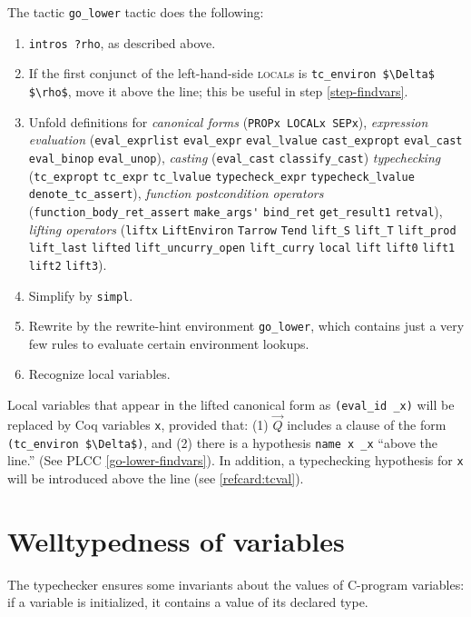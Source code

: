 \documentclass[12pt,fleqn,openany,oneside,showtrims]{memoir}
\newcommand{\ychapter}[2]{\chapter[#1]{#1 \hfill \normalsize #2}}
\begin{document}
The tactic \lstinline{go_lower} tactic
does the following:
\begin{enumerate}
\item \lstinline{intros ?rho}, as described above.
\item If the first conjunct of the 
left-hand-side \textsc{local}s is
\lstinline{tc_environ $\Delta$ $\rho$}, move it
above the line; this be useful in step \ref{step-findvars}.
\item Unfold definitions for
\emph{canonical forms}
(\lstinline{PROPx LOCALx SEPx}),
\emph{expression evaluation}
(\lstinline{eval_exprlist}
\lstinline{eval_expr}
\lstinline{eval_lvalue}
\lstinline{cast_expropt}
\lstinline{eval_cast}
\lstinline{eval_binop}
\lstinline{eval_unop}),
\emph{casting} (\lstinline{eval_cast} \lstinline{classify_cast})
\emph{typechecking} (\lstinline{tc_expropt}
\lstinline{tc_expr}
\lstinline{tc_lvalue}
\lstinline{typecheck_expr}
\lstinline{typecheck_lvalue}
\lstinline{denote_tc_assert}),
\emph{function postcondition operators} (\lstinline{function_body_ret_assert}
\lstinline{make_args'}
\lstinline{bind_ret}
\lstinline{get_result1}
\lstinline{retval}),
\emph{lifting operators} (\lstinline{liftx}
\lstinline{LiftEnviron}
\lstinline{Tarrow}
\lstinline{Tend}
\lstinline{lift_S}
\lstinline{lift_T}
\lstinline{lift_prod}
\lstinline{lift_last}
\lstinline{lifted}
\lstinline{lift_uncurry_open}
\lstinline{lift_curry}
\lstinline{local}
\lstinline{lift}
\lstinline{lift0}
\lstinline{lift1}
\lstinline{lift2}
\lstinline{lift3}).
\item Simplify by \lstinline{simpl}.
\item Rewrite by the rewrite-hint environment \lstinline{go_lower}, which contains just a very few rules to evaluate certain environment lookups.
\item Recognize local variables. \label{step-findvars}
\end{enumerate}

Local variables that appear in the lifted canonical form
as \lstinline{(eval_id _x)} will be replaced by
Coq variables \lstinline{x}, provided that:
(1)  $\vec{Q}$ includes a clause of the
form \lstinline{(tc_environ $\Delta$)},
and (2) there is a hypothesis \lstinline{name x _x} ``above the line.''
(See PLCC \autoref{go-lower-findvars}).
In addition, a typechecking hypothesis for \lstinline{x}
will be introduced above the line (see \autoref{refcard:tcval}).

\ychapter{Welltypedness of variables}{}
\label{refcard:tcval}

The typechecker ensures some invariants about the values
of C-program variables: if a variable is initialized, it contains
a value of its declared type.
\end{document}
